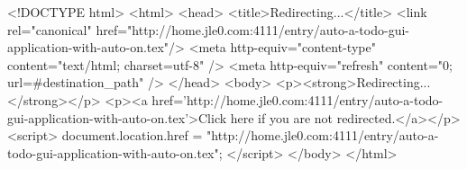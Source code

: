 <!DOCTYPE html>
<html>
<head>
<title>Redirecting...</title>
<link rel="canonical" href="http://home.jle0.com:4111/entry/auto-a-todo-gui-application-with-auto-on.tex"/>
<meta http-equiv="content-type" content="text/html; charset=utf-8" />
<meta http-equiv="refresh" content="0; url=#{destination_path}" />
</head>
<body>
  <p><strong>Redirecting...</strong></p>
  <p><a href='http://home.jle0.com:4111/entry/auto-a-todo-gui-application-with-auto-on.tex'>Click here if you are not redirected.</a></p>
  <script>
    document.location.href = "http://home.jle0.com:4111/entry/auto-a-todo-gui-application-with-auto-on.tex";
  </script>
</body>
</html>

